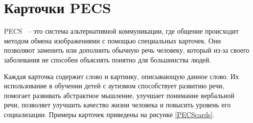 %
%
%
%
%
%
%
%

\section{Карточки PECS}

PECS~\cite{pecs} – это система альтернативной коммуникации, где общение происходит методом обмена изображениями с помощью специальных карточек. Они позволяют заменить или дополнить обычную речь человеку, который из-за своего заболевания не способен объяснять понятно для большинства людей.

Каждая карточка содержит слово и картинку, описывающую данное слово. 
Их использование в обучении детей с аутизмом способствует развитию речи, помогает развивать абстрактное мышление, улучшает понимание вербальной речи, позволяет улучшить качество жизни человека и повысить уровень его социализации.
Примеры карточек приведены на рисунке \ref{PECScards}.

